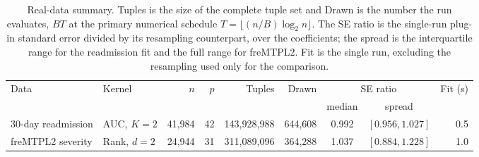 \begin{table}[t]
\centering
\small
\setlength{\tabcolsep}{5pt}
\begin{tabular}{llrrrrccr}
\toprule
Data & Kernel & $n$ & $p$ & Tuples & Drawn & \multicolumn{2}{c}{SE ratio} & Fit (s)\\
\cmidrule(lr){7-8}
 & & & & & & median & spread & \\
\midrule
30-day readmission & AUC, $K=2$ & 41{,}984 & 42 & 143{,}928{,}988 & 644{,}608 & 0.992 & $[0.956,1.027]$ & 0.5\\
freMTPL2 severity & Rank, $d=2$ & 24{,}944 & 31 & 311{,}089{,}096 & 364{,}288 & 1.037 & $[0.884,1.228]$ & 1.0\\
\bottomrule
\end{tabular}
\caption{Real-data summary. Tuples is the size of the complete tuple set and Drawn is the number the run evaluates, $BT$ at the primary numerical schedule $T=\lfloor (n/B)\log_2 n\rfloor$. The SE ratio is the single-run plug-in standard error divided by its resampling counterpart, over the coefficients; the spread is the interquartile range for the readmission fit and the full range for freMTPL2. Fit is the single run, excluding the resampling used only for the comparison.}
\label{tab:real-supp}
\end{table}

